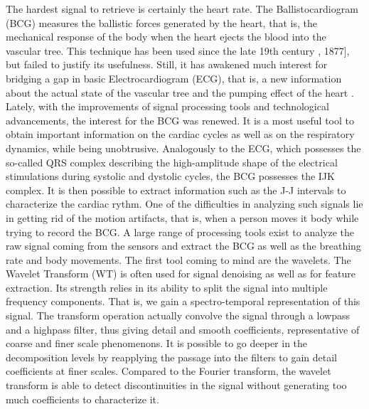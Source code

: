 \documentclass[twoside,onecolumn]{article}
\begin{document}
The hardest signal to retrieve is certainly the heart rate. The Ballistocardiogram (BCG) measures the ballistic forces generated by the heart, that is, the mechanical response of the body when the heart ejects the blood into the vascular tree. This technique has been used since the late 19th century \cite{gordon_certain_1877}, 1877], but failed to justify its usefulness. Still, it has awakened much interest for bridging a gap in basic Electrocardiogram (ECG), that is, a new information about the actual state of the vascular tree and the pumping effect of the heart \cite{singewald_ballistocardiography:_1954}. Lately, with the improvements of signal processing tools and technological advancements, the interest for the BCG was renewed. It is a most useful tool to obtain important information on the cardiac cycles as well as on the respiratory dynamics, while being unobtrusive. Analogously to the ECG, which possesses the so-called QRS complex describing the high-amplitude shape of the electrical stimulations during systolic and dystolic cycles, the BCG possesses the IJK complex. It is then possible to extract information such as the J-J intervals to characterize the cardiac rythm. One of the difficulties in analyzing such signals lie in getting rid of the motion artifacts, that is, when a person moves it body while trying to record the BCG.
A large range of processing tools exist to analyze the raw signal coming from the sensors and extract the BCG as well as the breathing rate and body movements. The first tool coming to mind are the wavelets.
The Wavelet Transform (WT) is often used for signal denoising as well as for feature extraction. Its strength relies in its ability to split the signal into multiple frequency components. That is, we gain a spectro-temporal representation of this signal. The transform operation actually convolve the signal through  a lowpass and a highpass filter, thus giving detail and smooth coefficients, representative of coarse and finer scale phenomenons. It is possible to go deeper in the decomposition levels by reapplying the passage into the filters to gain detail coefficients at finer scales. Compared to the Fourier transform, the wavelet transform is able to detect discontinuities in the signal without generating too much coefficients to characterize it. 
\end{document}
